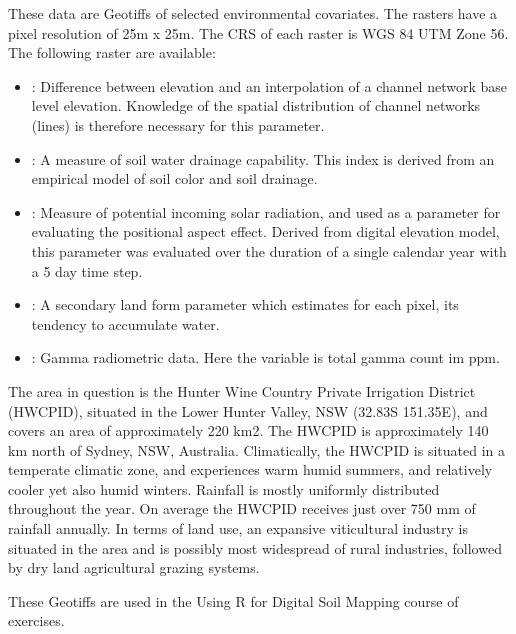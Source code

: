 \documentclass[a4paper]{book}
\begin{document}
\begin{Format}
These data are Geotiffs of selected environmental covariates. The rasters have a pixel resolution of 25m x 25m. The CRS of each raster is WGS 84 UTM Zone 56. The following raster are available:
\begin{itemize}

\item{} : Difference between elevation and an interpolation of a channel network base level elevation. Knowledge of the spatial distribution of channel networks (lines) is therefore necessary for this parameter.
\item{} : A measure of soil water drainage capability. This index is derived from an empirical model of soil color and soil drainage. 
\item{} : Measure of potential incoming solar radiation, and used as a parameter for evaluating the positional aspect effect. Derived from digital elevation model, this parameter was evaluated over the duration of a single calendar year with a 5 day time step.
\item{} : A secondary land form parameter which estimates for each pixel, its tendency to accumulate water.
\item{} : Gamma radiometric data. Here the variable is total gamma count im ppm.

\end{itemize}

\end{Format}
%
\begin{Details}
The area in question is the Hunter Wine Country Private Irrigation District (HWCPID), situated in the Lower Hunter Valley, NSW (32.83S 151.35E), and covers an area of approximately 220 km2. The HWCPID is approximately 140 km north of Sydney, NSW, Australia. Climatically, the HWCPID is situated in a temperate climatic zone, and experiences warm humid summers, and relatively cooler yet also humid winters. Rainfall is mostly uniformly distributed throughout the year. On average the HWCPID receives just over 750 mm of rainfall annually. In terms of land use, an expansive viticultural industry is situated in the area and is possibly most widespread
of rural industries, followed by dry land agricultural grazing systems.
\end{Details}
%
\begin{Note}
These Geotiffs are used in the Using R for Digital Soil Mapping course of exercises.
\end{Note}
\end{document}
